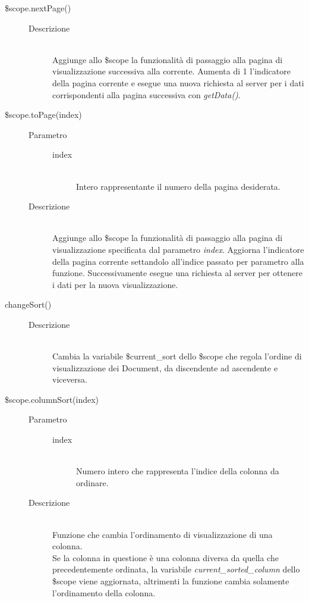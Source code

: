 \begin{description}
\begin{description}
  
  \item[\$scope.nextPage()] \hfill
  \begin{description}
  	\item[Descrizione] \hfill \\  
  Aggiunge allo \$scope la funzionalità di passaggio alla pagina di visualizzazione successiva alla corrente.
  Aumenta di 1 l'indicatore della pagina corrente e esegue una nuova richiesta al server per i dati corrispondenti alla pagina successiva con \textit{getData()}.
    \end{description}

  
  \item[\$scope.toPage(index)] \hfill
  \begin{description}
  	\item[Parametro] \hfill
  		\begin{description}
  			\item[index] \hfill \\
  			Intero rappresentante il numero della pagina desiderata.
       \end{description}
  	\item[Descrizione] \hfill \\
   Aggiunge allo \$scope la funzionalità di passaggio alla pagina di visualizzazione specificata dal parametro \textit{index}.
  Aggiorna l'indicatore della pagina corrente settandolo all'indice passato per parametro alla funzione.
  Successivamente esegue una richiesta al server per ottenere i dati per la nuova visualizzazione.
    \end{description}

  
  \item[changeSort()] \hfill
  \begin{description}
  	\item[Descrizione] \hfill \\  
  Cambia la variabile \$current\_sort dello \$scope che regola l'ordine di visualizzazione dei Document, da discendente ad ascendente e viceversa.
    \end{description}

  
  \item[\$scope.columnSort(index)] \hfill
   \begin{description}
  	\item[Parametro] \hfill
  		\begin{description}
  			\item[index] \hfill \\
  			Numero intero che rappresenta l'indice della colonna da ordinare.
       \end{description}
  	\item[Descrizione] \hfill \\
   Funzione che cambia l'ordinamento di visualizzazione di una colonna. \\
  Se la colonna in questione è una colonna diversa da quella che precedentemente ordinata,
  la variabile \textit{current\_sorted\_column} dello \$scope viene aggiornata, altrimenti la funzione cambia solamente l'ordinamento della colonna.
    \end{description}
    

\end{description}
\end{description}
